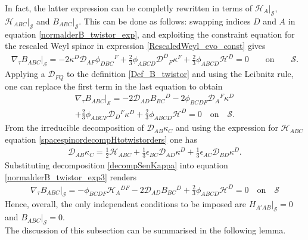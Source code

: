 \documentclass[10pt,a4paper]{article}
\theoremstyle{plain}
\begin{document}
In fact, the latter expression can be completly rewritten in terms of
$\mathcal{H}_A|_{\mathcal{S}}$, $\mathcal{H}_{ABC}|_{\mathcal{S}}$ and
$B_{ABC}|_{\mathcal{S}}$. This can be done as follows: swapping
indices $D$ and $A$ in equation \eqref{normalderB_twistor_exp}, and
exploiting the constraint equation for the rescaled Weyl spinor in
expression \eqref{RescaledWeyl_evo_const} gives
\begin{align}\label{normalderB_twistor_exp2}
\nabla_{\tau}B_{ABC}|_{\mathcal{S}}= -2 \kappa ^{D} \mathcal{D}
_{AF}\phi _{DBC}{}^{F} + \tfrac{2}{3} \phi _{ABCD} \mathcal{D}
^{D}{}_{F}\kappa ^{F} + \tfrac{2}{3}\phi_{ABCD}\mathcal{H}^D = 0
\qquad \text{on} \qquad \mathcal{S}.
\end{align}
Applying a $\mathcal{D}_{FQ}$ to the definition \eqref{Def_B_twistor}
and using the Leibnitz rule, one can replace the first term in the
last equation to obtain
\begin{multline}\label{normalderB_twistor_exp3}
\nabla_{\tau}B_{ABC}|_{\mathcal{S}}= -2 \mathcal{D} _{AD}B_{BC}{}^{D}
-2 \phi _{BCDF} \mathcal{D} _{A}{}^{F}\kappa ^{D} \\+\tfrac{2}{3} \phi
_{ABCF} \mathcal{D} _{D}{}^{F}\kappa ^{D} +
\tfrac{2}{3}\phi_{ABCD}\mathcal{H}^D = 0 \quad \text{on} \quad
\mathcal{S}.
\end{multline}
From the irreducible decomposition of $\mathcal{D} _{AB}\kappa _{C}$
and using the expression for $\mathcal{H}_{ABC}$ equation
\eqref{spacespinordecompHtotwistorders} one has
\begin{align}\label{decompSenKappa}
\mathcal{D} _{AB}\kappa _{C} = \tfrac{1}{2} \mathcal{H} _{ABC} +
\tfrac{1}{3} \epsilon _{BC} \mathcal{D} _{AD}\kappa ^{D} +
\tfrac{1}{3} \epsilon _{AC} \mathcal{D} _{BD}\kappa ^{D}.
\end{align}
Substituting decomposition \eqref{decompSenKappa} into equation
\eqref{normalderB_twistor_exp3} renders
\begin{align}\label{time-derBToBH}
\nabla_{\tau}B_{ABC}|_{\mathcal{S}}=- \phi _{BCDF} \mathcal{H}
_{A}{}^{DF} -2 \mathcal{D} _{AD}B_{BC}{}^{D} +
\tfrac{2}{3}\phi_{ABCD}\mathcal{H}^D = 0 \quad \text{on} \quad
\mathcal{S}
\end{align}
Hence, overall, the only independent conditions to be imposed are
$H_{A'AB}|_{\mathcal{S}}=0$ and $B_{ABC}|_{\mathcal{S}}=0$.  \\

The discussion of this subsection can be summarised in the following lemma.
\end{document}
